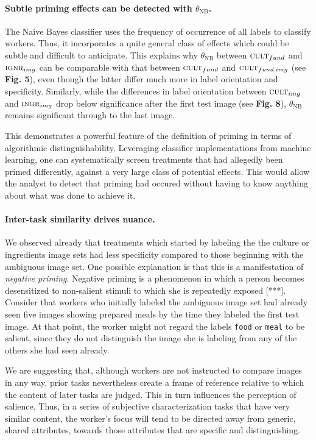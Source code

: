 \documentclass[a4paper]{report}
\begin{document}
\paragraph{Subtle priming effects can be detected with $\theta_\text{NB}$.}
The Naive Bayes classifier uses the frequency of occurrence of all labels to
classify workers.  Thus, it incorporates a quite general class of effects which
could be subtle and difficult to anticipate.  This explains why 
$\theta_\text{NB}$ 
between $\textsc{cult}_{fund}$ and $\textsc{ignr}_{img}$ can be comparable with
that between $\textsc{cult}_{fund}$ and $\textsc{cult}_{fund,img}$ 
(see \textbf{Fig. 5}), even though the latter differ much more in label 
orientation and specificity.  Similarly, while the differences in label
orientation between $\textsc{cult}_{img}$ and $\textsc{ingr}_{img}$ drop below 
significance after the first test image (see \textbf{Fig. 8}), 
$\theta_\text{NB}$ remains significant through to the last image.

This demonstrates a powerful feature of the definition of priming in terms of 
algorithmic distinguishability.  Leveraging classifier implementations from
machine learning, one can systematically screen treatments that had allegedly 
been primed differently, against a very large class of potential effects.  This
would allow the analyst to detect that priming had occured without having to 
know anything about what was done to achieve it.

\paragraph{Inter-task similarity drives nuance.}
We observed already that treatments which started by labeling the the 
culture or ingredients image sets had less specificity compared to 
those beginning with the ambiguous image set.  One possible explanation is that
this is a manifestation of \textit{negative priming}.  Negative priming is a 
phenomenon in which a person becomes desensitized to non-salient stimuli to 
which she is repeatedly exposed [***].  Consider that workers who initially 
labeled the ambiguous image set had already seen five images showing 
prepared meals by the time they labeled the first test image.  At that point,
the worker might not regard the labels \texttt{food} or \texttt{meal} to be 
salient, since they do not distinguish the image she is labeling from any of 
the others she had seen already.

We are suggesting that, although workers are not instructed to compare
images in any way, prior tasks nevertheless create a frame of reference
relative to which the content of later tasks are judged.  This in turn 
influences the perception of salience. Thus, in a series of subjective 
characterization tasks that have very similar content, the worker's focus 
will tend to be directed away from generic, shared attributes, towards those 
attributes that are specific and distinguishing.
\end{document}
